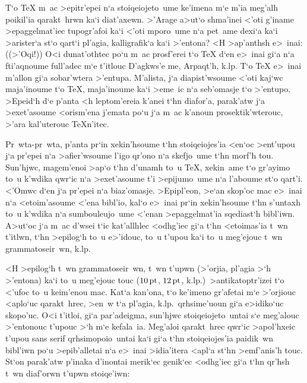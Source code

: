 T`o {\rm\TeX} m~ac >epitr'epei n`a stoiqeiojeto~ume ke'imena m`e m'ia
meg'alh poikil'ia qarakt~hrwn ka`i diat'axewn.  >'Arage a>ut`o shma'inei
<'oti g'iname >epaggelmat'iec tupogr'afoi ka`i <'oti mporo~ume n`a
pet~ame dexi`a ka`i >arister`a st`o qart`i pl'agia, kalligrafik`a ka`i
>'entona?  <H >ap'anthsh e>~inai: ((>'Oqi!))  O<i dunat'othtec po`u m~ac
prosf'erei t`o {\rm\TeX} d`en e>~inai gi`a n`a fti'aqnoume full'adec m`e
t'itlouc {\tengs D'agkws'e me}, {Arpaqt'h}, k.lp.  T`o
{\rm\TeX} e>~inai m'allon gi`a sobar'wtera >'entupa. M'alista, j`a
diapist'wsoume <'oti kaj`wc maja'inoume t`o {\rm\TeX}, maja'inoume ka`i
>eme~ic n`a seb'omasje t`o >'entupo. >Epeid`h d`e p'anta <h leptom'ereia
k'anei t`hn diafor'a, parak'atw j`a >exet'asoume <orism'ena j'emata po`u
j`a m~ac k'anoun prosektik'wterouc, >'ara kal'uterouc {\rm\TeX}n'itec.

Pr~wta-pr~wta, p'anta pr`in xekin'hsoume t`hn stoiqeiojes'ia <en`oc
>ent'upou j`a pr'epei n`a >afie\-r'w\-sou\-me l'igo qr'ono n`a
skefjo~ume t`hn morf'h tou.  Sun'hjwc, magem'enoi >ap`o t`hn d'unamh
to~u {\rm\TeX}, xekin~ame t`o gr'ayimo to~u k'wdika qwr`ic n`a
>exet'asoume t'i >epijumo~ume n`a l'aboume st`o qart'i.  <'Omwc d`en j`a
pr'epei n`a biaz'omasje.  >Epipl'eon, >e`an skop'oc mac e>~inai n`a
<etoim'asoume <'ena bibl'io, kal`o e>~inai pr`in xekin'hsoume t`hn
s'untaxh to~u k'wdika n`a sumbouleujo~ume <'enan >epaggelmat'ia
sqediast`h bibl'iwn.  A>ut`oc j`a m~ac d'wsei t`ic kat'allhlec <odhg'iec
gi`a t`hn <etoimas'ia t~wn t'itlwn, t`hn >epilog`h to~u e>'idouc, to~u
t'upou ka`i to~u meg'ejouc t~wn grammatoseir~wn, k.lp.

<H >epilog`h t~wn grammatoseir~wn, t~wn t'upwn (>'orjia, pl'agia >`h
>'entona) ka`i to~u meg'ejouc touc ($10\,\rm pt$, $12\,\rm pt$, k.lp.)\
>antikatoptr'izei t`o <'ufoc to~u keim'enou mac. Kat`a kan'ona, t`o
ke'imeno gr'afetai m`e >'orjiouc <aplo`uc qarakt~hrec, >en~w t`a
pl'agia, k.lp.\ qrhsime'uoun gi`a e>idiko`uc skopo'uc.  O<i t'itloi,
gi`a par'adeigma, sun'hjwc stoiqeiojeto~untai s`e meg'alouc >'entonouc
t'upouc >`h m`e kefala~ia.  Meg'aloi qarakt~hrec qwr`ic >apol'hxeic
t'upou {\sf sans serif} qrhsimopoio~untai ka`i gi`a t`hn stoiqeiojes'ia
paidik~wn bibl'iwn po`u >epib'alletai n`a e>~inai >idia'itera <apl`a
st`hn >emf'anis'h touc. St`on parak'atw p'inaka d'inontai merik`ec
genik`ec <odhg'iec gi`a t`hn qr'hsh t~wn diaf'orwn t'upwn stoiqe'iwn:

